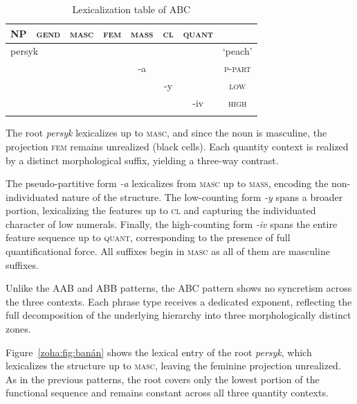 \documentclass[output=paper,colorlinks,citecolor=brown
]{langscibook}
\begin{document}
\begin{table}
\begin{tabularx}{0.75\textwidth}{cccccccc}
\lsptoprule
\textsc{NP}&{\textsc{gend}} & {\textsc{masc}} & {\textsc{fem}} & {\textsc{mass}} & {\textsc{cl}} & {\textsc{quant}}\\
\midrule
\multicolumn{2}{l}{\cellcolor[gray]{0.9}persyk} & {\cellcolor[gray]{0.9}} & {\cellcolor{black}} & {} & {} & {} & {`peach'}\\[.5ex]
\cellcolor[gray]{0.9} & {\cellcolor[gray]{0.9}} & {\cellcolor[gray]{0.8}} & {\cellcolor{black}} & {\cellcolor[gray]{0.8}-a} & {} & {} & {\textsc{p-part}}\\[.5ex]
\cellcolor[gray]{0.9} & {\cellcolor[gray]{0.9}} & {\cellcolor[gray]{0.7}} & {\cellcolor{black}} & {\cellcolor[gray]{0.7}} & {\cellcolor[gray]{0.7}-y} & {} & {\textsc{low}} \\[.5ex]
\cellcolor[gray]{0.9} & {\cellcolor[gray]{0.9}} & {\cellcolor[gray]{0.6}} & {\cellcolor{black}} & {\cellcolor[gray]{0.6}} & {\cellcolor[gray]{0.6}} & {\cellcolor[gray]{0.6}-iv} & {\textsc{high}} \\[.5ex]
\lspbottomrule
\end{tabularx}
\caption{Lexicalization table of ABC}
\label{zoha:tab:lexABC}
\end{table}

\noindent The root \textit{persyk} lexicalizes up to \textsc{masc}, and since the noun is masculine, the projection \textsc{fem} remains unrealized (black cells). Each quantity context is realized by a distinct morphological suffix, yielding a three-way contrast.

The pseudo-partitive form \textit{-a} lexicalizes from \textsc{masc} up to \textsc{mass}, encoding the non-individuated nature of the structure. The low-counting form \textit{-y} spans a broader portion, lexicalizing the features up to \textsc{cl} and capturing the individuated character of low numerals. Finally, the high-counting form \textit{-iv} spans the entire feature sequence up to \textsc{quant}, corresponding to the presence of full quantificational force. All suffixes begin in \textsc{masc} as all of them are masculine suffixes.

Unlike the AAB and ABB patterns, the ABC pattern shows no syncretism across the three contexts. Each phrase type receives a dedicated exponent, reflecting the full decomposition of the underlying hierarchy into three morphologically distinct zones. 

Figure~\ref{zoha:fig:banán} shows the lexical entry of the root \textit{persyk}, which lexicalizes the structure up to \textsc{masc}, leaving the feminine projection unrealized. As in the previous patterns, the root covers only the lowest portion of the functional sequence and remains constant across all three quantity contexts.
\end{document}
